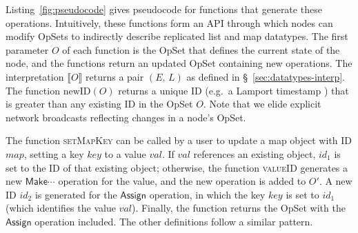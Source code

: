 \noindent
Listing~\ref{fig:pseudocode} gives pseudocode for functions that generate these operations.
Intuitively, these functions form an API through which nodes can modify OpSets to indirectly describe replicated list and map datatypes.
The first parameter $O$ of each function is the OpSet that defines the current state of the node, and the functions return an updated OpSet containing new operations.
The interpretation $\llbracket O \rrbracket$ returns a pair $(E,\, L)$ as defined in \S~\ref{sec:datatypes-interp}.
The function $\mathrm{newID}(O)$ returns a unique ID (e.g.\ a Lamport timestamp \cite{Lamport:1978jq}) that is greater than any existing ID in the OpSet $O$.
Note that we elide explicit network broadcasts reflecting changes in a node's OpSet.

The function \textsc{setMapKey} can be called by a user to update a map object with ID $\mathit{map}$, setting a key $\mathit{key}$ to a value $\mathit{val}$.
If $\mathit{val}$ references an existing object, $\mathit{id}_1$ is set to the ID of that existing object; otherwise, the function \textsc{valueID} generates a new $\mathsf{Make}\cdots$ operation for the value, and the new operation is added to $O'$.
A new ID $\mathit{id}_2$ is generated for the $\mathsf{Assign}$ operation, in which the key $\mathit{key}$ is set to $\mathit{id}_1$ (which identifies the value $\mathit{val}$).
Finally, the function returns the OpSet with the $\mathsf{Assign}$ operation included.
The other definitions follow a similar pattern.

